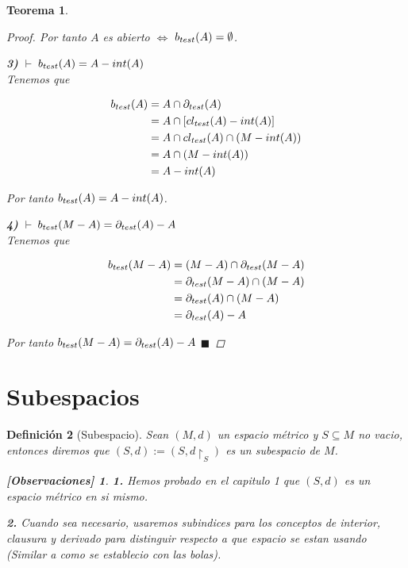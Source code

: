 \documentclass[oneside]{book} %
\theoremstyle{Teorema}
\newtheorem{Definicion}{Definición}[chapter]
\newtheorem{Teorema}[Definicion]{Teorema}
\theoremstyle{Ejemplos}
\theoremstyle{[Obs]}
\newtheorem*{Obs}{[Observaciones]}
\def \test {test}
\newcommand{\cerradura}[2][\test]{\ifx \test #1 {\overline{#2}} \else {cl_{#1}(#2)} \fi} %
\newcommand{\frontera}[2][\test]{\ifx \test #1 {\partial(#2)} \else {\partial_{#1}(#2)} \fi} %
\newcommand{\borde}[2][\test]{\ifx \test #1 {b(#2)} \else {b_{#1}(#2)} \fi} %
\renewcommand{\{}{\left\lbrace} %
\renewcommand{\}}{\right\rbrace} %
\newcommand{\n}{\cap} %
\renewcommand{\sc}{\subseteq} %
\renewcommand{\qed}{$\blacksquare$} %
\newcommand{\pd}{$\vdash\ $} %
\begin{document}
\begin{Teorema}
\begin{proof}
					Por tanto $A$ es abierto $\Leftrightarrow$ $\borde{A} = \emptyset$.

					\textbf{3)} \pd $\borde{A} = A - int(A)$ \\ 
					Tenemos que 

					\begin{align*}
						\borde{A} &= A \n \frontera{A} \\
						&= A \n [\cerradura{A} - int(A)] \\ 
						&= A \n \cerradura{A} \n (M - int(A)) \\ 
						&= A \n (M - int(A)) \\ 
						&= A - int(A)
					\end{align*}

					Por tanto $\borde{A} = A - int(A)$.

					\textbf{4)} \pd $\borde{M - A} = \frontera{A} - A$ \\ 
					Tenemos que

					\begin{align*}
						\borde{M - A} &= (M - A) \n \frontera{M - A} \\ 
						&= \frontera{M - A} \n (M - A) \\ 
						&= \frontera{A} \n (M - A) \\ 
						&= \frontera{A} - A 
					\end{align*}

					Por tanto $\borde{M - A} = \frontera{A} - A$ \qed

				\end{proof}

			\end{Teorema}

		\section{Subespacios}

			\begin{Definicion}[Subespacio]\setlength{\parindent}{0em}
			
				Sean $(M, d)$ un espacio métrico y $S \sc M$ no vacio, entonces diremos que $(S, d) := (S, d\restriction_{S})$ es un subespacio de $M$.

				\begin{Obs}
				
					\textbf{1.} Hemos probado en el capitulo 1 que $(S, d)$ es un espacio métrico en si mismo.

					\textbf{2.} Cuando sea necesario, usaremos subindices para los conceptos de interior, clausura y derivado para distinguir respecto a que espacio se estan usando (Similar a como se establecio con las bolas).
				
				\end{Obs}
			
			\end{Definicion}
\end{document}

